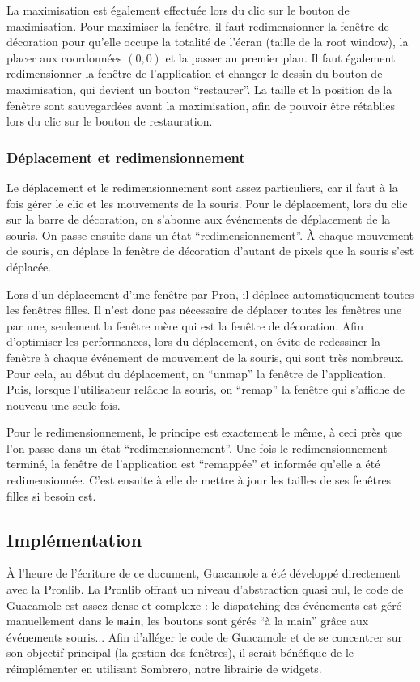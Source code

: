 La maximisation est également effectuée lors du clic sur le bouton de maximisation.
Pour maximiser la fenêtre, il faut redimensionner la fenêtre de décoration pour qu'elle occupe la totalité de l'écran (taille de la root window), la placer aux coordonnées $(0, 0)$ et la passer au premier plan.
Il faut également redimensionner la fenêtre de l'application et changer le dessin du bouton de maximisation, qui devient un bouton ``restaurer''.
La taille et la position de la fenêtre sont sauvegardées avant la maximisation, afin de pouvoir être rétablies lors du clic sur le bouton de restauration.

\subsubsection{Déplacement et redimensionnement}

Le déplacement et le redimensionnement sont assez particuliers, car il faut à la fois gérer le clic et les mouvements de la souris.
Pour le déplacement, lors du clic sur la barre de décoration, on s'abonne aux événements de déplacement de la souris.
On passe ensuite dans un état ``redimensionnement''.
À chaque mouvement de souris, on déplace la fenêtre de décoration d'autant de pixels que la souris s'est déplacée.

Lors d'un déplacement d'une fenêtre par Pron, il déplace automatiquement toutes les fenêtres filles.
Il n'est donc pas nécessaire de déplacer toutes les fenêtres une par une, seulement la fenêtre mère qui est la fenêtre de décoration.
Afin d'optimiser les performances, lors du déplacement, on évite de redessiner la fenêtre à chaque événement de mouvement de la souris, qui sont très nombreux.
Pour cela, au début du déplacement, on ``unmap'' la fenêtre de l'application.
Puis, lorsque l'utilisateur relâche la souris, on ``remap'' la fenêtre qui s'affiche de nouveau une seule fois.

Pour le redimensionnement, le principe est exactement le même, à ceci près que l'on passe dans un état ``redimensionnement''.
Une fois le redimensionnement terminé, la fenêtre de l'application est ``remappée'' et informée qu'elle a été redimensionnée.
C'est ensuite à elle de mettre à jour les tailles de ses fenêtres filles si besoin est.

\subsection{Implémentation}

À l'heure de l'écriture de ce document, Guacamole a été développé directement avec la Pronlib.
La Pronlib offrant un niveau d'abstraction quasi nul, le code de Guacamole est assez dense et complexe : le dispatching des événements est géré manuellement dans le \verb|main|, les boutons sont gérés ``à la main'' grâce aux événements souris...
Afin d'alléger le code de Guacamole et de se concentrer sur son objectif principal (la gestion des fenêtres), il serait bénéfique de le réimplémenter en utilisant Sombrero, notre librairie de widgets.
